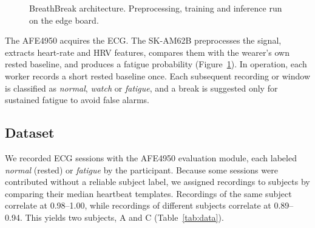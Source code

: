 \documentclass[11pt]{article}
\begin{document}
\begin{figure}[h]
\centering
{}
\caption{BreathBreak architecture. Preprocessing, training and inference run on the edge board.}
\label{fig:arch}
\end{figure}

The AFE4950 \cite{afe4950} acquires the ECG. The SK-AM62B \cite{am62x} preprocesses the signal, extracts
heart-rate and HRV features, compares them with the wearer's own rested baseline, and produces a fatigue
probability (Figure~\ref{fig:arch}). In operation, each worker records a short rested baseline once.
Each subsequent recording or window is classified as \emph{normal}, \emph{watch} or \emph{fatigue}, and a
break is suggested only for sustained fatigue to avoid false alarms.

\subsection{Dataset}

We recorded ECG sessions with the AFE4950 evaluation module, each labeled \emph{normal} (rested) or
\emph{fatigue} by the participant. Because some sessions were contributed without a reliable subject label,
we assigned recordings to subjects by comparing their median heartbeat templates. Recordings of the same
subject correlate at 0.98--1.00, while recordings of different subjects correlate at 0.89--0.94. This yields
two subjects, A and C (Table~\ref{tab:data}).
\end{document}
